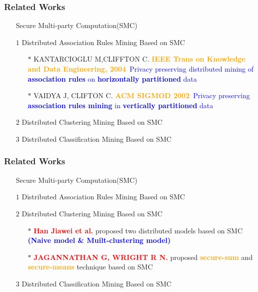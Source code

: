\documentclass{beamer} %
\newcommand{\blue}[1]{\textcolor{blue}{#1}}
\newcommand{\red}[1]{\textcolor{red}{#1}}
\newcommand{\orange}[1]{\textcolor{orange}{#1}}
\begin{document}
\begin{frame}
\frametitle{Related Works}
\begin{itemize} \itemsep2pt \parskip0pt 
    \item[] Secure Multi-party Computation(SMC)
    \item[$1$] Distributed Association Rules Mining Based on SMC
    \begin{itemize} \itemsep2pt \parskip0pt 
        \item[$\ast$] KANTARCIOGLU M,CLIFFTON C.  \orange{{\bf IEEE Trans on Knowledge and Data Engineering, 2004}}\newline ~\blue{Privacy preserving distributed mining of {\bf association rules} on {\bf horizontally partitioned} data}
        \vspace{6mm}
        \item[$\ast$] VAIDYA J, CLIFTON C.  \orange{{\bf ACM SIGMOD 2002}}\newline ~\blue{Privacy preserving {\bf association rules mining} in {\bf vertically partitioned} data}
    \end{itemize}
    \item[$2$] Distributed Clustering Mining Based on SMC

    \item[$3$] Distributed Classification Mining Based on SMC
\end{itemize}



\end{frame}
\begin{frame}
\frametitle{Related Works}
\begin{itemize} \itemsep2pt \parskip0pt 
    \item[] Secure Multi-party Computation(SMC)
    \item[$1$] Distributed Association Rules Mining Based on SMC
    \item[$2$] Distributed Clustering Mining Based on SMC
    \begin{itemize} \itemsep2pt \parskip0pt 
        \item[$\ast$] \red{\bf Han Jiawei et al.} proposed two distributed models based on SMC \blue{\bf (Naive model \& Muilt-clustering model)}
        \vspace{6mm}
        \item[$\ast$] \red{\bf JAGANNATHAN G, WRIGHT R N.} proposed \orange{\bf secure-sum} and \orange{\bf secure-means} technique based on SMC
    \end{itemize}
    \item[$3$] Distributed Classification Mining Based on SMC
\end{itemize}

\end{frame}
\end{document}
